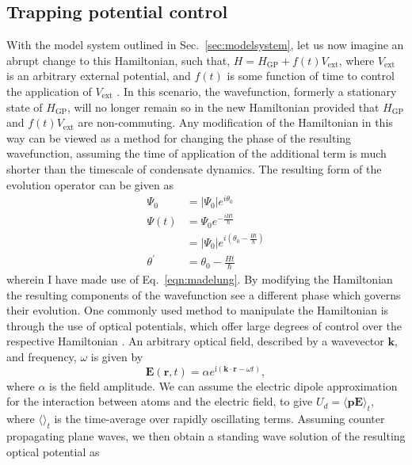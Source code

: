 \subsection{Trapping potential control}\label{ss:pert_opt_latt}
With the model system outlined in Sec.~\ref{sec:modelsystem}, let us now imagine an abrupt change to this Hamiltonian, such that, $H = H_{\textrm{GP}} + f(t) V_{\textrm{ext}}$, where  $V_{\textrm{ext}}$ is an arbitrary external potential, and $f(t)$ is some function of time to control the application of $V_{\textrm{ext}}$ . In this scenario, the wavefunction, formerly a stationary state of $H_{\textrm{GP}}$, will no longer remain so in the new Hamiltonian provided that $H_{\textrm{GP}} $ and $f(t) V_{\textrm{ext}}$ are non-commuting. Any modification of the Hamiltonian in this way can be viewed as a method for changing the phase of the resulting wavefunction, assuming the time of application of the additional term is much shorter than the timescale of condensate dynamics.
The resulting form of the evolution operator can be given as
\begin{subequations}
\begin{align}
    \Psi_0 &= |\Psi_0|e^{i\theta_0} \\
    \Psi(t) &= \Psi_0 e^{-\frac{i H t}{\hbar}} \\
            &= |\Psi_0| e^{i\left(\theta_0 - \frac{H t}{\hbar}\right)} \nonumber \\
    \theta^{'} &= \theta_0 - \frac{H t}{\hbar}
\end{align}
\end{subequations}
wherein I have made use of Eq.~\ref{eqn:madelung}. By modifying the Hamiltonian the resulting components of the wavefunction see a different phase which governs their evolution. One commonly used method to manipulate the Hamiltonian is through the use of optical potentials, which offer large degrees of control over the respective Hamiltonian \cite{Many-body physics with ultracold gases}. An arbitrary optical field, described by a wavevector $\mathbf{k}$, and frequency, $\omega$ is given by
\begin{equation}
    \mathbf{E}(\mathbf{r},t) = \alpha e^{\textrm{i}\left(\mathbf{k}\cdot\mathbf{r} - \omega t\right)},
\end{equation}
where $\alpha$ is the field amplitude. We can assume the electric dipole approximation for the interaction between atoms and the electric field, to give $U_d = \langle \mathbf{p}\mathbf{E}\rangle_t$, where $\langle \rangle_t$ is the time-average over rapidly oscillating terms. Assuming counter propagating plane waves, we then obtain a standing wave solution of the resulting optical potential as
